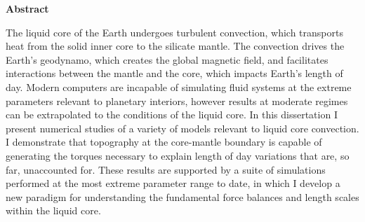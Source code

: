 \documentclass[12pt]{article}
\begin{document}
\pagestyle{fancy}
\thispagestyle{fancy}
\fancyhf{} %
\fancyhead[L]{\textcolor{red}{Tobias Oliver\\
Abstract of PhD Dissertation}}
\fancyfoot[R]{\thepage}
\begin{center}
	\textbf{Abstract}
\end{center}
The liquid core of the Earth undergoes turbulent convection, which transports heat from the solid inner core to the silicate mantle. 
The convection drives the Earth's geodynamo, which creates the global magnetic field, and facilitates interactions between the mantle and the core, which impacts Earth's length of day. 
Modern computers are incapable of simulating fluid systems at the extreme parameters relevant to planetary interiors, however results at moderate regimes can be extrapolated to the conditions of the liquid core.
In this dissertation I present numerical studies of a variety of models relevant to liquid core convection. 
I demonstrate that topography at the core-mantle boundary is capable of generating the torques necessary to explain length of day variations that are, so far, unaccounted for. These results are supported by a suite of simulations performed at the most extreme parameter range to date, in which I develop a new paradigm for understanding the fundamental force balances and length scales within the liquid core.
\end{document}
